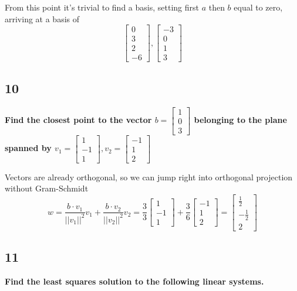 \documentclass[10pt,letterpaper]{article}
\begin{document}
		From this point it's trivial to find a basis, setting first $a$ then $b$ equal to zero, arriving at a basis of 
		$$
		\boxed{\begin{bmatrix}
			0 \\ 3 \\ 2 \\ -6
			\end{bmatrix}, \begin{bmatrix}
			-3 \\ 0 \\ 1 \\ 3
			\end{bmatrix}}
		$$
	\subsection*{10} \textbf{Find the closest point to the vector $b = \begin{bmatrix}
		1 \\ 0 \\ 3
		\end{bmatrix}$ belonging to the plane spanned by $v_1 = \begin{bmatrix}
		1 \\ -1 \\ 1
		\end{bmatrix}, v_2 = \begin{bmatrix}
		-1 \\ 1 \\ 2
		\end{bmatrix}$}
		
		Vectors are already orthogonal, so we can jump right into orthogonal projection without Gram-Schmidt
		$$
		w = \frac{b \cdot v_1}{||v_1||^2}v_1 + \frac{b \cdot v_2}{||v_2||^2}v_2 = \frac{3}{3} \begin{bmatrix}
		1 \\ -1 \\ 1
		\end{bmatrix} + \frac{3}{6} \begin{bmatrix}
		-1 \\ 1 \\  2
		\end{bmatrix} \boxed{= \begin{bmatrix}
			\frac{1}{2} \\ -\frac{1}{2} \\ 2
			\end{bmatrix}}
		$$
	\subsection*{11} \textbf{Find the least squares solution to the following linear systems. }
\end{document}
